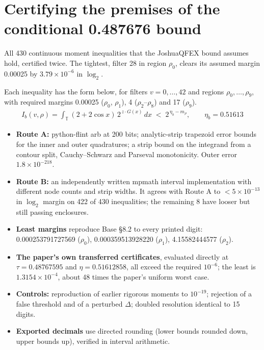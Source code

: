 \documentclass[11pt]{article}
\theoremstyle{plain}
\begin{document}
\section{Certifying the premises of the conditional 0.487676 bound}

All 430 continuous moment inequalities that the JoshuaQFEX bound assumes hold, certified twice. The tightest, filter 28 in region $\rho_0$, clears its assumed margin 0.00025 by $3.79\times10^{-6}$ in $\log_2$.

Each inequality has the form below, for filters $v = 0,\dots,42$ and regions $\rho_0,\dots,\rho_9$, with required margins 0.00025 ($\rho_0$, $\rho_1$), 4 ($\rho_2$--$\rho_8$) and 17 ($\rho_9$).
\begin{gather*}
I_b(v,\rho) = \int_{\mathbb T} (2+2\cos x)\, 2^{\,z\cdot G(x)}\, dx \;<\; 2^{\,\eta_b - m_\rho}, \qquad \eta_b = 0.51613
\end{gather*}

\begin{itemize}
\item \textbf{Route A:} python-flint arb at 200 bits; analytic-strip trapezoid error bounds~\cite[Thm.~3.2]{tw} for the inner and outer quadratures; a strip bound on the integrand from a contour split, Cauchy--Schwarz and Parseval monotonicity. Outer error $1.8\times10^{-218}$.
\item \textbf{Route B:} an independently written mpmath interval implementation with different node counts and strip widths. It agrees with Route A to $< 5\times10^{-13}$ in $\log_2$ margin on 422 of 430 inequalities; the remaining 8 have looser but still passing enclosures.
\item \textbf{Least margins} reproduce Base \S8.2 to every printed digit: 0.000253791727569 ($\rho_0$), 0.000359513928220 ($\rho_1$), 4.15582444577 ($\rho_2$).
\item \textbf{The paper's own transferred certificates}, evaluated directly at $\tau = 0.48767595$ and $\eta = 0.51612858$, all exceed the required $10^{-6}$; the least is $1.3154\times10^{-4}$, about 48 times the paper's uniform worst case.
\item \textbf{Controls:} reproduction of earlier rigorous moments to $10^{-19}$; rejection of a false threshold and of a perturbed $\Delta$; doubled resolution identical to 15 digits.
\item \textbf{Exported decimals} use directed rounding (lower bounds rounded down, upper bounds up), verified in interval arithmetic.
\end{itemize}
\end{document}
